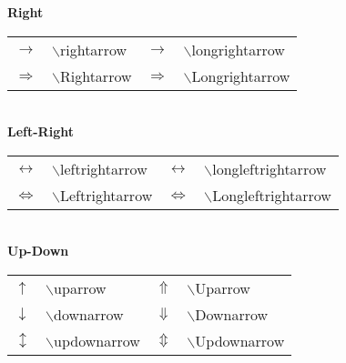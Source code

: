 			\textbf{Right}\\
			\begin{tabular}{ p{} p{} 
							p{} p{}  }
			\toprule
			$\rightarrow $		&$\backslash$rightarrow& 
			$\longrightarrow$	&$\backslash$longrightarrow \\
			$\Rightarrow$		&$\backslash$Rightarrow&
			$\Longrightarrow$	&$\backslash$Longrightarrow \\
			\bottomrule
			\end{tabular} \\
		
			\textbf{Left-Right}\\
			\begin{tabular}{ p{} p{} 
							p{} p{}  }
			\toprule
			$\leftrightarrow $		&$\backslash$leftrightarrow& 
			$\longleftrightarrow$	&$\backslash$longleftrightarrow \\
			$\Leftrightarrow$		&$\backslash$Leftrightarrow&
			$\Longleftrightarrow$	&$\backslash$Longleftrightarrow \\
			\bottomrule
			\end{tabular} \\

			\textbf{Up-Down}\\
			\begin{tabular}{ p{} p{} 
							p{} p{}  }
			\toprule
			$\uparrow $			&$\backslash$uparrow& 
			$\Uparrow$				&$\backslash$Uparrow \\
			$\downarrow$			&$\backslash$downarrow&
			$\Downarrow$			&$\backslash$Downarrow\\
			$\updownarrow$		&$\backslash$updownarrow&
			$\Updownarrow$		&$\backslash$Updownarrow\\
			\bottomrule
			\end{tabular} \\

